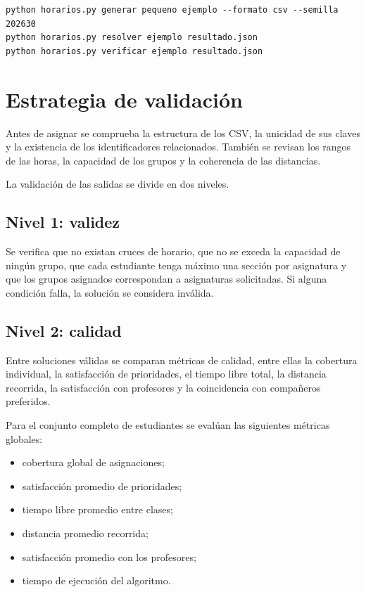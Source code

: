 \documentclass[11pt]{article}
\numberwithin{equation}{section}
\numberwithin{figure}{section}
\numberwithin{table}{section}
\theoremstyle{definition}
\begin{document}
\begin{verbatim}
python horarios.py generar pequeno ejemplo --formato csv --semilla 202630
python horarios.py resolver ejemplo resultado.json
python horarios.py verificar ejemplo resultado.json
\end{verbatim}

\section{Estrategia de validación}

Antes de asignar se comprueba la estructura de los CSV, la unicidad
de sus claves y la existencia de los identificadores relacionados.
También se revisan los rangos de las horas, la capacidad de los grupos
y la coherencia de las distancias.

La validación de las salidas se divide en dos niveles.

\subsection{Nivel 1: validez}

Se verifica que no existan cruces de horario, que no se exceda la capacidad de
ningún grupo, que cada estudiante tenga máximo una sección por asignatura y que
los grupos asignados correspondan a asignaturas solicitadas. Si alguna
condición falla, la solución se considera inválida.

\subsection{Nivel 2: calidad}

Entre soluciones válidas se comparan métricas de calidad, entre ellas la
cobertura individual, la satisfacción de prioridades, el tiempo libre total,
la distancia recorrida, la satisfacción con profesores y la coincidencia con
compañeros preferidos.

Para el conjunto completo de estudiantes se evalúan las siguientes métricas
globales:

\begin{itemize}
  \item cobertura global de asignaciones;
  \item satisfacción promedio de prioridades;
  \item tiempo libre promedio entre clases;
  \item distancia promedio recorrida;
  \item satisfacción promedio con los profesores;
  \item tiempo de ejecución del algoritmo.
\end{itemize}
\end{document}
